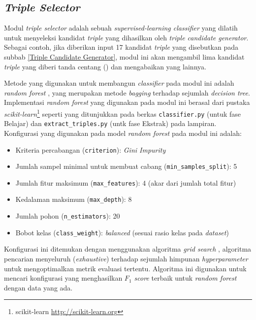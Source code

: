 \subsection{\textit{Triple Selector}}  \label{Triple Selector}

Modul \textit{triple selector} adalah sebuah \textit{supervised-learning classifier} yang dilatih untuk menyeleksi kandidat \textit{triple} yang dihasilkan oleh \textit{triple candidate generator}. Sebagai contoh, jika diberikan input 17 kandidat \textit{triple} yang disebutkan pada subbab \ref{Triple Candidate Generator}, modul ini akan mengambil lima kandidat \textit{triple} yang diberi tanda centang () dan mengabaikan yang lainnya.

Metode yang digunakan untuk membangun \textit{classifier} pada modul ini adalah \textit{random forest} \citep{breiman2001random}, yang merupakan metode \textit{bagging} terhadap sejumlah \textit{decision tree}. Implementasi \textit{random forest} yang digunakan pada modul ini berasal dari pustaka \textit{scikit-learn}\footnote{scikit-learn \url{http://scikit-learn.org}} seperti yang ditunjukkan pada berkas \verb|classifier.py| (untuk fase Belajar) dan \verb|extract_triples.py| (untk fase Ekstrak) pada lampiran. Konfigurasi yang digunakan pada model \textit{random forest} pada modul ini adalah:

\begin{itemize}
\item Kriteria percabangan (\verb|criterion|): \textit{Gini Impurity}
\item Jumlah sampel minimal untuk membuat cabang  (\verb|min_samples_split|): 5
\item Jumlah fitur maksimum  (\verb|max_features|): 4 (akar dari jumlah total fitur)
\item Kedalaman maksimum  (\verb|max_depth|): 8
\item Jumlah pohon (\verb|n_estimators|): 20
\item Bobot kelas (\verb|class_weight|): \textit{balanced} (sesuai rasio kelas pada \textit{dataset})
\end{itemize}

Konfigurasi ini ditemukan dengan menggunakan algoritma \textit{grid search} \citep{wasserman2015grid}, algoritma pencarian menyeluruh (\textit{exhaustive}) terhadap sejumlah himpunan \textit{hyperparameter} untuk mengoptimalkan metrik evaluasi tertentu. Algoritma ini digunakan untuk mencari konfigurasi yang menghasilkan \textit{$F_1$ score} terbaik untuk \textit{random forest} dengan data yang ada.

